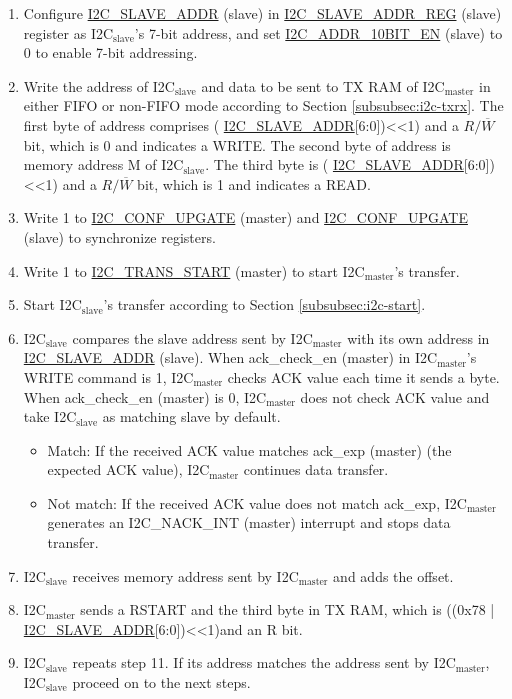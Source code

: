 \documentclass[main\_\_EN.tex]{subfiles}
\begin{document}
\begin{enumerate}
\item Configure \hyperref[fielddesc:I2CSLAVEADDR]{I2C\_SLAVE\_ADDR} (slave) in \hyperref[regdesc:I2CSLAVEADDRREG]{I2C\_SLAVE\_ADDR\_REG} (slave) register as I2C$_\text{slave}$'s 7-bit address, and set \hyperref[fielddesc:I2CADDR10BITEN]{I2C\_ADDR\_10BIT\_EN} (slave) to 0 to enable 7-bit addressing.
\item Write the address of I2C$_\text{slave}$ and data to be sent to TX RAM of I2C$_\text{master}$ in either FIFO or non-FIFO mode according to Section \ref{subsubsec:i2c-txrx}. The first byte of address comprises ( \hyperref[fielddesc:I2CSLAVEADDR]{I2C\_SLAVE\_ADDR}[6:0])<<1) and a $R/\overline W$ bit, which is 0 and indicates a WRITE. The second byte of address is memory address M of I2C$_\text{slave}$. The third byte is ( \hyperref[fielddesc:I2CSLAVEADDR]{I2C\_SLAVE\_ADDR}[6:0])<<1) and a $R/\overline W$ bit, which is 1 and indicates a READ.

\item Write 1 to \hyperref[fielddesc:I2CCONFUPGATE]{I2C\_CONF\_UPGATE} (master) and \hyperref[fielddesc:I2CCONFUPGATE]{I2C\_CONF\_UPGATE} (slave) to synchronize registers.
\item Write 1 to \hyperref[fielddesc:I2CTRANSSTART]{I2C\_TRANS\_START} (master) to start I2C$_\text{master}$'s transfer.
\item Start I2C$_\text{slave}$'s transfer according to Section \ref{subsubsec:i2c-start}.
\item I2C$_\text{slave}$ compares the slave address sent by I2C$_\text{master}$ with its own address in \hyperref[fielddesc:I2CSLAVEADDR]{I2C\_SLAVE\_ADDR} (slave). When ack\_check\_en (master) in I2C$_\text{master}$'s WRITE command is 1, I2C$_\text{master}$ checks ACK value each time it sends a byte. When ack\_check\_en (master) is 0, I2C$_\text{master}$ does not check ACK value and take I2C$_\text{slave}$ as matching slave by default.
\begin{itemize}
\item Match: If the received ACK value matches ack\_exp (master) (the expected ACK value), I2C$_\text{master}$ continues data transfer.
\item Not match: If the received ACK value does not match ack\_exp, I2C$_\text{master}$ generates an I2C\_NACK\_INT (master) interrupt and stops data transfer.
\end{itemize}
\item I2C$_\text{slave}$ receives memory address sent by I2C$_\text{master}$ and adds the offset.
\item I2C$_\text{master}$ sends a RSTART and the third byte in TX RAM, which is ((0x78 | \hyperref[fielddesc:I2CSLAVEADDR]{I2C\_SLAVE\_ADDR}[6:0])<<1)and an R bit.
\item I2C$_\text{slave}$ repeats step 11. If its address matches the address sent by I2C$_\text{master}$, I2C$_\text{slave}$ proceed on to the next steps.


\end{enumerate}
\end{document}
